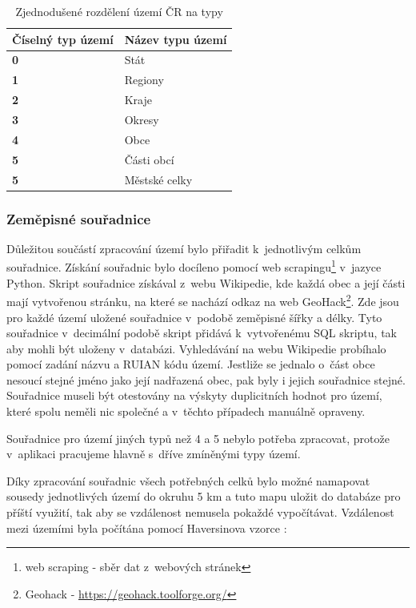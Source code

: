 \begin{table} \label{tabulka_typy}
	\centering
	\begin{tabular}{ll}
		\hline
		\textbf{Číselný typ území} & \textbf{Název typu území} \\ \hline
		\textbf{0} & Stát \\ 
		\textbf{1} & Regiony \\ 
		\textbf{2} & Kraje \\ 
		\textbf{3} & Okresy \\ 
		\textbf{4} & Obce \\ 
		\textbf{5} & Části obcí \\ 
		\textbf{5} & Městské celky \\ 
	\end{tabular}
	\caption{Zjednodušené rozdělení území ČR na typy}
\end{table}

\subsubsection{Zeměpisné souřadnice}
Důležitou součástí zpracování území bylo přiřadit k~jednotlivým celkům souřadnice. Získání souřadnic bylo docíleno pomocí web scrapingu\footnote{web scraping - sběr dat z~webových stránek} v~jazyce Python. Skript souřadnice získával z~webu Wikipedie, kde každá obec a její části mají vytvořenou stránku, na které se nachází odkaz na web GeoHack\footnote{Geohack - \url{https://geohack.toolforge.org/}}. Zde jsou pro každé území uložené souřadnice v~podobě zeměpisné šířky a délky. Tyto souřadnice v~decimální podobě skript přidává k~vytvořenému SQL skriptu, tak aby mohli být uloženy v~databázi. Vyhledávání na webu Wikipedie probíhalo pomocí zadání názvu a RUIAN kódu území. Jestliže se jednalo o~část obce nesoucí stejné jméno jako její nadřazená obec, pak byly i jejich souřadnice stejné. Souřadnice museli být otestovány na výskyty duplicitních hodnot pro území, které spolu neměli nic společné a v~těchto případech manuálně opraveny.

Souřadnice pro území jiných typů než 4 a 5 nebylo potřeba zpracovat, protože v~aplikaci pracujeme hlavně s~dříve zmíněnými typy území.

Díky zpracování souřadnic všech potřebných celků bylo možné namapovat sousedy jednotlivých území do okruhu 5 km a tuto mapu uložit do databáze pro příští využití, tak aby se vzdálenost nemusela pokaždé vypočítávat. Vzdálenost mezi územími byla počítána pomocí Haversinova vzorce \cite{Haversine}:

